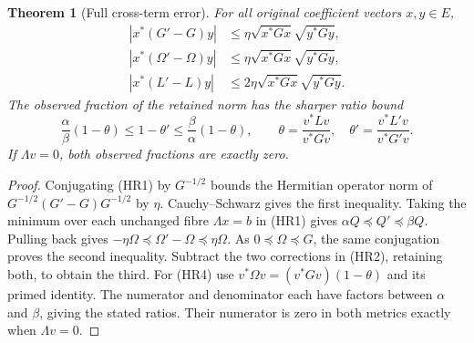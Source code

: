 \documentclass[11pt]{article}
\newtheorem{theorem}{Theorem}[section]
\begin{document}
\begin{theorem}[Full cross-term error]
For all original coefficient vectors $x,y\in E$,
\begin{equation}\tag{HR3}
 \begin{aligned}
 |x^*(G'-G)y|&\le\eta\sqrt{x^*Gx}\sqrt{y^*Gy},\\
 |x^*(\Omega'-\Omega)y|&\le\eta\sqrt{x^*Gx}\sqrt{y^*Gy},\\
 |x^*(L'-L)y|&\le2\eta\sqrt{x^*Gx}\sqrt{y^*Gy}.
 \end{aligned}
\end{equation}
The observed fraction of the retained norm has the sharper ratio bound
\begin{equation}\tag{HR4}
 \frac\alpha\beta(1-\theta)\le1-\theta'
                 \le\frac\beta\alpha(1-\theta),\qquad
 \theta=\frac{v^*Lv}{v^*Gv},\quad
 \theta'=\frac{v^*L'v}{v^*G'v}.
\end{equation}
If $\Lambda v=0$, both observed fractions are exactly zero.
\end{theorem}
\begin{proof}
Conjugating (HR1) by $G^{-1/2}$ bounds the Hermitian operator norm of
$G^{-1/2}(G'-G)G^{-1/2}$ by $\eta$. Cauchy--Schwarz gives the
first inequality. Taking the minimum over each unchanged fibre
$\Lambda x=b$ in (HR1) gives $\alpha Q\preceq Q'\preceq\beta Q$.
Pulling back gives
$-\eta\Omega\preceq\Omega'-\Omega\preceq\eta\Omega$.
As $0\preceq\Omega\preceq G$, the same conjugation proves the
second inequality. Subtract the two corrections in (HR2), retaining
both, to obtain the third. For (HR4) use
$v^*\Omega v=(v^*Gv)(1-\theta)$ and its primed identity. The
numerator and denominator each have factors between $\alpha$ and
$\beta$, giving the stated ratios. Their numerator is zero in both
metrics exactly when $\Lambda v=0$.
\end{proof}
\end{document}
